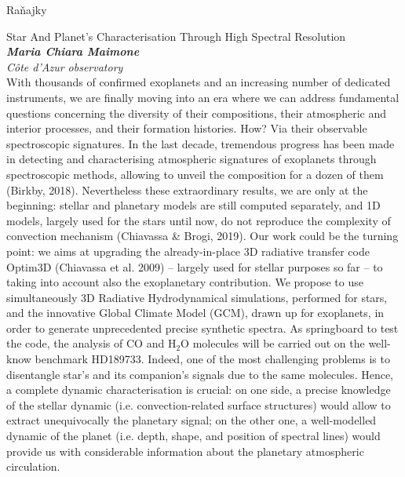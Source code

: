 \documentclass[a4paper]{report}
\begin{document}
                    \begin{tcolorbox}[
                                    colback=red!10,
                    colframe=red!50!black,
                                fonttitle=\Large\bfseries,
                title=09:00
            ]
                {\Large Raňajky}
                                                            \end{tcolorbox}
                    \begin{tcolorbox}[
                                    colback=white,
                    colframe=black!70!white,
                                fonttitle=\Large\bfseries,
                title=10:00
            ]
                {\Large Star And Planet’s Characterisation Through High Spectral Resolution}
                                                            \\ \textbf{\textit{Maria Chiara Maimone}}
                                                    \\ \textit{Côte d’Azur observatory}                \\[2ex]With thousands of confirmed exoplanets and an increasing number of dedicated instruments, we are finally moving into an era where we can address fundamental questions concerning the diversity of their compositions, their atmospheric and interior processes, and their formation histories. How? Via their observable spectroscopic signatures. In the last decade, tremendous progress has been made in detecting and characterising atmospheric signatures of exoplanets through spectroscopic methods, allowing to unveil the composition for a dozen of them (Birkby, 2018).
Nevertheless these extraordinary results, we are only at the beginning: stellar and planetary models are still computed separately, and 1D models, largely used for the stars until now, do not reproduce the complexity of convection mechanism (Chiavassa \& Brogi, 2019). Our work could be the turning point: we aims at upgrading the already-in-place 3D radiative transfer code Optim3D (Chiavassa et al. 2009) -- largely used for stellar purposes so far -- to taking into account also the exoplanetary contribution. We propose to use simultaneously 3D Radiative Hydrodynamical simulations, performed for stars, and the innovative Global Climate Model (GCM), drawn up for exoplanets, in order to generate unprecedented precise synthetic spectra. As springboard to test the code, the analysis of CO and $\mathrm{H}_2\mathrm{O}$ molecules will be carried out on the well-know benchmark HD189733. Indeed, one of the most challenging problems is to disentangle star’s and its companion’s signals due to the same molecules. Hence, a complete dynamic characterisation is crucial: on one side, a precise knowledge of the stellar dynamic (i.e. convection-related surface structures) would allow to extract unequivocally the planetary signal; on the other one, a well-modelled dynamic of the planet (i.e. depth, shape, and position of spectral lines) would provide us with considerable information about the planetary atmospheric circulation.
            \end{tcolorbox}
            
\end{document}
